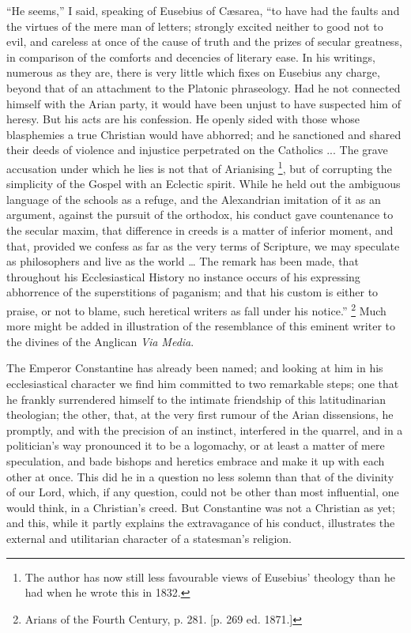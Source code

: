 ``He seems,'' I said, speaking of Eusebius of Cæsarea,
``to have had the faults and the virtues of the mere man of
letters; strongly excited neither to good not to evil, and careless at
once of the cause of truth and the prizes of secular greatness, in
comparison of the comforts and decencies of literary ease. In his
writings, numerous as they are, there is very little which fixes on
Eusebius any charge, beyond that of an attachment to the Platonic
phraseology. Had he not connected himself with the Arian party, it
would have been unjust to have suspected him of heresy. But his acts
are his confession. He openly sided with those whose blasphemies a
true Christian would have abhorred; and he sanctioned and shared their
deeds of violence and injustice perpetrated on the Catholics ... The
grave accusation under which he lies is not that of Arianising \footnote{The author has now still less favourable
views of Eusebius' theology than he had when he wrote this in 1832.}, but of corrupting the simplicity of the Gospel with an
Eclectic spirit. While he held out the ambiguous language of the
schools as a refuge, and the Alexandrian imitation of it as an
argument, against the pursuit of the orthodox, his conduct gave
countenance to the secular maxim, that difference in creeds is a
matter of inferior moment, and that, provided we confess as far as the
very terms of Scripture, we may speculate as philosophers and live as
the world … The remark has been made, that throughout his
Ecclesiastical History no instance occurs of his expressing abhorrence
of the superstitions of paganism; and that his custom is either to
praise, or not to blame, such heretical writers as fall under his
notice.'' \footnote{Arians of the Fourth
Century, p. 281. [p.
269 ed. 1871.]} Much more
might be added in illustration of the resemblance of this eminent
writer to the divines of the Anglican \emph{Via Media}.

The Emperor Constantine has already been named; and looking at him
in his ecclesiastical character we find him committed to two
remarkable steps; one that he frankly surrendered himself to the
intimate friendship of this latitudinarian theologian; the other,
that, at the very first rumour of the Arian dissensions, he promptly,
and with the precision of an instinct, interfered in the quarrel, and
in a politician's way pronounced it to be a logomachy, or at least a
matter of mere speculation, and bade bishops and heretics embrace and
make it up with each other at once. This did he in a question no less
solemn than that of the divinity of our Lord, which, if any question,
could not be other than most influential, one would think, in a Christian's creed. But Constantine was not a Christian as yet; and
this, while it partly explains the extravagance of his conduct,
illustrates the external and utilitarian character of a statesman's
religion.

